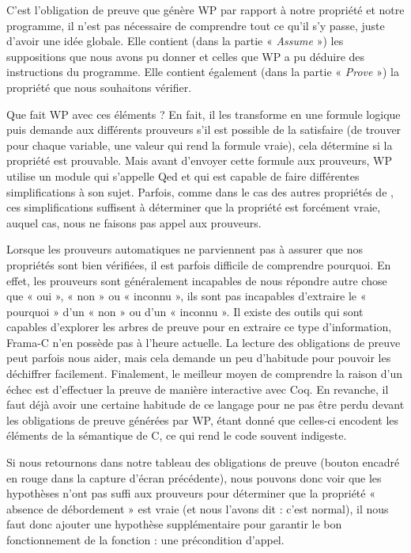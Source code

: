 

C'est l'obligation de preuve que génère WP par rapport à notre propriété et
notre programme, il n'est pas nécessaire de comprendre tout ce qu'il s'y passe,
juste d'avoir une idée globale. Elle contient (dans la partie « \textit{Assume} ») les
suppositions que nous avons pu donner et celles que WP a pu déduire des
instructions du programme. Elle contient également (dans la partie « \textit{Prove} »)
la propriété que nous souhaitons vérifier.



Que fait WP avec ces éléments ? En fait, il les transforme en une formule
logique puis demande aux différents prouveurs s'il est possible de la
satisfaire (de trouver pour chaque variable, une valeur qui rend la formule
vraie), cela détermine si la propriété est prouvable. Mais avant d'envoyer
cette formule aux prouveurs, WP utilise un module qui s'appelle Qed et qui est
capable de faire différentes simplifications à son sujet. Parfois, comme dans
le cas des autres propriétés de , ces simplifications suffisent à
déterminer que la propriété est forcément vraie, auquel cas, nous ne faisons
pas appel aux prouveurs.



Lorsque les prouveurs automatiques ne parviennent pas à assurer que nos
propriétés sont bien vérifiées, il est parfois difficile de comprendre
pourquoi. En effet, les prouveurs sont généralement incapables de nous
répondre autre chose que « oui », « non » ou « inconnu », ils sont pas
incapables d'extraire le « pourquoi » d'un « non » ou d'un « inconnu ». Il
existe des outils qui
sont capables d'explorer les arbres de preuve pour en extraire ce type
d'information, Frama-C n'en possède pas à l'heure actuelle. La lecture des
obligations de preuve peut parfois nous aider, mais cela demande un peu
d'habitude pour pouvoir les déchiffrer facilement. Finalement, le meilleur
moyen de comprendre la raison d'un échec est d'effectuer la preuve de manière
interactive avec Coq. En revanche, il faut déjà avoir une certaine habitude de
ce langage pour ne pas être perdu devant les obligations de preuve générées par
WP, étant donné que celles-ci encodent les éléments de la sémantique de C, ce
qui rend le code souvent indigeste.



Si nous retournons dans notre tableau des obligations de preuve (bouton
encadré en rouge dans la capture d'écran précédente), nous pouvons donc voir
que les hypothèses n'ont pas suffi aux prouveurs pour déterminer que la
propriété  « absence de débordement » est vraie (et nous l'avons dit : c'est
normal), il nous faut donc ajouter une hypothèse supplémentaire pour garantir
le bon fonctionnement de la fonction : une précondition d'appel.



